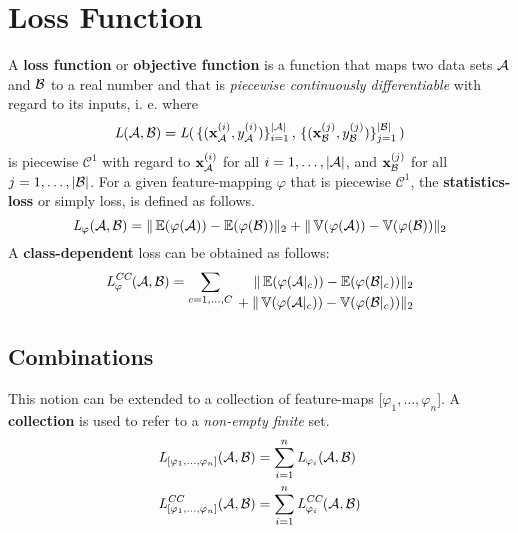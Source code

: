 \section{Loss Function}
A \textbf{loss function} or \textbf{objective function} is a function that maps two data sets $\mathcal A$ and $\mathcal B$ to a real number and that is \textit{piecewise continuously differentiable} with regard to its inputs,
i. e. where 
\[
    \textit{L} (\mathcal A, \mathcal B) = \textit{L} (
    \,\{(\mathbf x^{(i)}_{\mathcal A}, y^{(i)}_{\mathcal A})\}_{i=1}^{|\mathcal A|}\,,
    \,\{(\mathbf x^{(j)}_{\mathcal B}, y^{(j)}_{\mathcal B})\}_{j=1}^{|\mathcal B|}\,) 
\]
is piecewise $\mathcal C^1$ with regard to $\mathbf x^{(i)}_{\mathcal A}$
for all $i=1, \dots, |\mathcal A|$, and $\mathbf x^{(j)}_{\mathcal B}$ for all $j=1, \dots, |\mathcal B|$.
%
For a given feature-mapping $\varphi$ that is piecewise $\mathcal C ^1$, the \textbf{statistics-loss} or simply loss, is defined as follows.
% 
\begin{equation}
    \textit{L} _{\varphi} (\mathcal A, \mathcal B) = 
    \|\operatorname{\mathbb{E}} ({\varphi (\mathcal A)}) - \operatorname{\mathbb{E}} ({\varphi (\mathcal B)})\|_2 +
    \|\operatorname{\mathbb{V}} ({\varphi (\mathcal A)}) - \operatorname{\mathbb{V}} ({\varphi (\mathcal B)})\|_2
    \label{eqn:statistics_loss}
\end{equation}
% 
A \textbf{class-dependent} loss can be obtained as follows:
\begin{align}
\begin{split}
\label{eqn:class_statistics_loss}
    \textit{L}^\textit{CC} _\varphi (\mathcal A, \mathcal B) =
    \sum _{c = 1, \dots, C}
    \begin{alignedat}[t]{1}
        \|\operatorname{\mathbb{E}} ({\varphi (\mathcal A|_c)}) - \operatorname{\mathbb{E}}({\varphi (\mathcal B|_c)}) &\|_2 \\
        {} + \|\operatorname{\mathbb{V}} ({\varphi (\mathcal A|_c)}) - \operatorname{\mathbb{V}} ({\varphi (\mathcal B|_c)}) &\|_2 
    \end{alignedat}
\end{split}
\end{align}

\subsection{Combinations}

This notion can be extended to a collection of feature-maps [$\varphi_1, \dots, \varphi_n$].
A \textbf{collection} is used to refer to a \textit{non-empty finite} set.
\begin{align*}
    \textit{L}_{[\varphi_1, \dots, \varphi_n]} (\mathcal A, \mathcal B) &= 
    \sum_{i=1}^n \textit{L}_{\varphi_i} (\mathcal A, \mathcal B) \\
    \textit{L}^\textit{CC}_{[\varphi_1, \dots, \varphi_n]} (\mathcal A, \mathcal B) &= 
    \sum_{i=1}^n \textit{L}^\textit{CC}_{\varphi_i} (\mathcal A, \mathcal B)
\end{align*}


